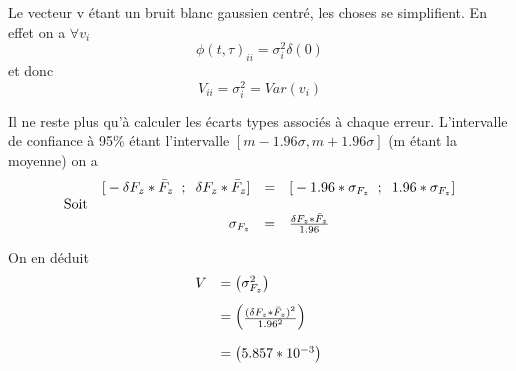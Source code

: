 \documentclass[12pt,twoside,a4paper]{article}
\begin{document}
Le vecteur v étant un bruit blanc gaussien centré, les choses se simplifient. En effet on a $\forall v_{i}$
$$\phi(t,\tau)_{ii} = \sigma_{i}^{2}\delta(0)$$ et donc
$$V_{ii} = \sigma_{i}^{2} = Var(v_{i})$$

Il ne reste plus qu'à calculer les écarts types associés à chaque erreur. L'intervalle de confiance à 95\% étant l'intervalle $[m-1.96\sigma, m+1.96\sigma]$ (m étant la moyenne) on a 
$$
\begin{array}{lrcl}
	&\text{[}-\delta F_{z}*\bar{F}_{z} \rule{2mm}{0mm} ; \rule{2mm}{0mm} \delta F_{z}*\bar{F}_{z} \text{]} &=& \text{[} -1.96*\sigma_{F_{z}} \rule{2mm}{0pt}; \rule{2mm}{0pt}1.96*\sigma_{F_{z}}  \text{]} \\
	\text{Soit} & & & \\
	& \sigma_{F_{z}} &=&  \frac{\delta F_{z}*\bar{F}_{z}}{1.96} \\
\end{array}
$$

\vspace{1cm}
On en déduit
$$
\begin{array}{ll}
V &= \begin{pmatrix}
\sigma_{F_{z}}^{2} %
\end{pmatrix} \\
&=  \begin{pmatrix}
\frac{(\delta F_{z}*\bar{F}_{z})^{2}}{1.96^{2}}%
\end{pmatrix} \rule{0pt}{20pt} \\
&= \begin{pmatrix} 5.857*10^{-3} \end{pmatrix} \rule{0pt}{20pt}
\end{array}
$$
\end{document}
